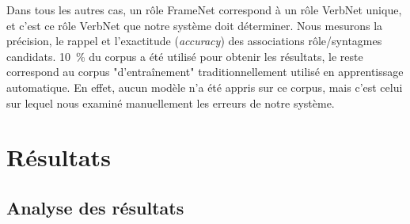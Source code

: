 Dans tous les autres cas, un rôle FrameNet correspond à un rôle VerbNet unique,
et c'est ce rôle VerbNet que notre système doit déterminer. Nous mesurons la
précision, le rappel et l'exactitude (\textit{accuracy}) des associations
rôle/syntagmes candidats. 10~\% du corpus a été utilisé pour obtenir les
résultats, le reste correspond au corpus "d'entraînement" traditionnellement
utilisé en apprentissage automatique. En effet, aucun modèle n'a été appris sur
ce corpus, mais c'est celui sur lequel nous examiné manuellement les erreurs de
notre système.

\section{Résultats}

\subsection{Analyse des résultats}
\label{resultats_srl}

